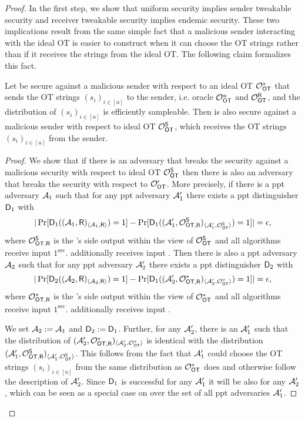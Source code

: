 \begin{proof}
In the first step, we show that uniform security implies sender tweakable security and receiver tweakable security implies endemic security. These two implications result from the same simple fact that a malicious sender interacting with the ideal OT is easier to construct when it can choose the OT strings rather than if it receives the strings from the ideal OT. The following claim formalizes this fact. 
\begin{claim}\label{claim:utocs}
Let \OT be secure against a malicious sender with respect to an ideal OT $\mathcal{O}_{\mathsf{OT}}^*$ that sends the OT strings $(s_i)_{i\in[n]}$ to the sender, i.e. oracle $\mathcal{O}_{\mathsf{OT}}^u$ and $\mathcal{O}_{\mathsf{OT}}^{\mathsf{R}}$, and the distribution of $(s_i)_{i\in[n]}$ is efficiently sampleable. Then \OT is also secure against a malicious sender with respect to ideal OT $\mathcal{O}_{\mathsf{OT}}^{\mathsf{S}}$, which receives the OT strings $(s_i)_{i\in[n]}$ from the sender.
\end{claim}


\begin{proof}
We show that if there is an adversary that breaks the security against a malicious security with respect to ideal OT $\mathcal{O}_{\mathsf{OT}}^{\mathsf{S}}$ then there is also an adversary that breaks the security with respect to $\mathcal{O}_{\mathsf{OT}}'$. More precisely, if there is a ppt adversary $\mathcal{A}_1$ such that for any ppt adversary $\mathcal{A}_1'$ there exists a ppt distinguisher $\mathsf D_1$ with 
$$
|\Pr[\mathsf D_1((\mathcal{A}_1,\mathsf{R})_{\langle \mathcal{A}_1, \mathsf{R}\rangle})=1] -\Pr[\mathsf D_1( (\mathcal{A}'_1, \mathcal{O}_{\mathsf{OT}, \mathsf{R}}^{\mathsf{S}})_{\langle \mathcal{A}_1', \mathcal{O}_{\mathsf{OT}}^{\mathsf{S}}\rangle})=1]|=\epsilon,
$$
where $\mathcal{O}_{\mathsf{OT}, \mathsf{R}}^{\mathsf{S}}$ is the \rec's side output within the view of $\mathcal{O}_{\mathsf{OT}}^{\mathsf{S}}$ and all algorithms receive input $1^\sec$. \rec additionally receives input \set.
Then there is also a ppt adversary $\mathcal{A}_2$ such that for any ppt adversary $\mathcal{A}_2'$ there exists a ppt distinguisher $\mathsf D_2$ with 
$$
|\Pr[\mathsf D_2((\mathcal{A}_2,\mathsf{R})_{\langle \mathcal{A}_2, \mathsf{R}\rangle})=1] -\Pr[\mathsf D_1( (\mathcal{A}'_2, \mathcal{O}_{\mathsf{OT}, \mathsf{R}}^*)_{\langle \mathcal{A}_2', \mathcal{O}_{\mathsf{OT}}^*\rangle})=1]|=\epsilon,
$$
where $\mathcal{O}_{\mathsf{OT}, \mathsf{R}}^*$ is the \rec's side output within the view of $\mathcal{O}_{\mathsf{OT}}^*$ and all algorithms receive input $1^\sec$. \rec additionally receives input \set.

We set $\mathcal{A}_2:=\mathcal{A}_1$ and $\mathsf D_2:=\mathsf D_1$. Further, for any $\mathcal{A}_2'$, there is an $\mathcal{A}_1'$  such that the distribution of $(\mathcal{A}'_2, \mathcal{O}_{\mathsf{OT}, \mathsf{R}}^*)_{\langle \mathcal{A}_2', \mathcal{O}_{\mathsf{OT}}^*\rangle}$ is identical with the distribution $(\mathcal{A}'_1, \mathcal{O}_{\mathsf{OT}, \mathsf{R}}^{\mathsf{S}})_{\langle \mathcal{A}_1', \mathcal{O}_{\mathsf{OT}}^{\mathsf{S}}\rangle}$. This follows from the fact that  $\mathcal{A}_1'$ could choose the OT strings $(s_i)_{i\in[n]}$  from the same distribution as $\mathcal{O}_{\mathsf{OT}}^*$ does and otherwise follow the description of $\mathcal{A}_2'$. Since $\mathsf D_1$ is successful for any $\mathcal{A}_1'$ it will be also for any $\mathcal{A}_2'$, which can be seen as a special case on over the set of all ppt adversaries $\mathcal{A}_1'$.
\end{proof}


\end{proof}
